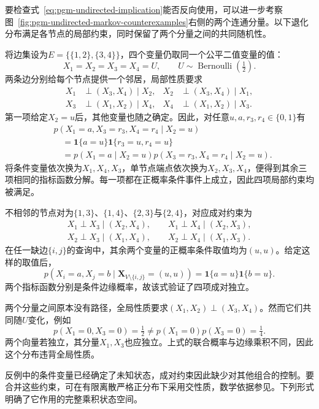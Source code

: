 要检查式~\eqref{eq:pgm-undirected-implication}能否反向使用，可以进一步考察图~\ref{fig:pgm-undirected-markov-counterexamples}右侧的两个连通分量。以下退化分布满足各节点的局部约束，同时保留了两个分量之间的共同随机性。

\begin{example}[局部、成对均不蕴含全局]
  \label{ex:pgm-undirected-local-not-global}
  将边集设为$E=\{\{1,2\},\{3,4\}\}$，四个变量仍取同一个公平二值变量的值：
  \[
    X_1=X_2=X_3=X_4=U,
    \qquad U\sim\operatorname{Bernoulli}(\tfrac12).
  \]
  两条边分别给每个节点提供一个邻居，局部性质要求
  \[
  \begin{aligned}
    X_1&\perp(X_3,X_4)\mid X_2,&
    X_2&\perp(X_3,X_4)\mid X_1,\\
    X_3&\perp(X_1,X_2)\mid X_4,&
    X_4&\perp(X_1,X_2)\mid X_3.
  \end{aligned}
  \]
  第一项给定$X_2=u$后，其他变量也随之确定。因此，对任意$u,a,r_3,r_4\in\{0,1\}$有
  \[
  \begin{aligned}
    &p(X_1=a,X_3=r_3,X_4=r_4\mid X_2=u)\\
    &\quad=\mathbf{1}\{a=u\}
            \mathbf{1}\{r_3=u,r_4=u\}\\
    &\quad=p(X_1=a\mid X_2=u)
            p(X_3=r_3,X_4=r_4\mid X_2=u).
  \end{aligned}
  \]
  将条件变量依次换为$X_1,X_4,X_3$，单节点端点依次换为$X_2,X_3,X_4$，便得到其余三项相同的指标函数分解。每一项都在正概率条件事件上成立，因此四项局部约束均被满足。

  不相邻的节点对为$\{1,3\}$、$\{1,4\}$、$\{2,3\}$与$\{2,4\}$，对应成对约束为
  \[
  \begin{gathered}
    X_1\perp X_3\mid(X_2,X_4),\qquad
    X_1\perp X_4\mid(X_2,X_3),\\
    X_2\perp X_3\mid(X_1,X_4),\qquad
    X_2\perp X_4\mid(X_1,X_3).
  \end{gathered}
  \]
  在任一缺边$\{i,j\}$的查询中，其余两个变量的正概率条件取值均为$(u,u)$。给定这样的取值后，
  \[
    p(X_i=a,X_j=b\mid\bm{X}_{V\setminus\{i,j\}}=(u,u))
    =\mathbf{1}\{a=u\}\mathbf{1}\{b=u\}.
  \]
  两个指标函数分别是条件边缘概率，故该式验证了四项成对独立。

  两个分量之间原本没有路径，全局性质要求$(X_1,X_2)\perp(X_3,X_4)$。然而它们共同随$U$变化，例如
  \[
    p(X_1=0,X_3=0)=\tfrac12
    \neq p(X_1=0)p(X_3=0)=\tfrac14.
  \]
  两个向量若独立，其分量$X_1,X_3$也应独立。上式的联合概率与边缘乘积不同，因此这个分布违背全局性质。
\end{example}

反例中的条件变量已经确定了未知状态，成对约束因此缺少对其他组合的控制。要合并这些约束，可在有限离散严格正分布下采用交性质，数学依据参见。下列形式明确了它作用的完整乘积状态空间。

